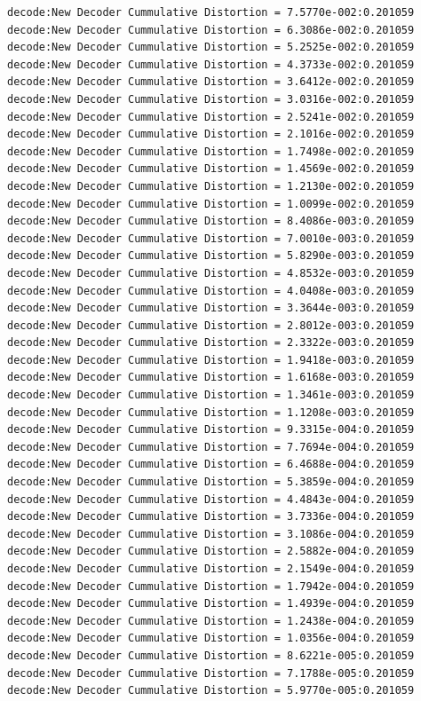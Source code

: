 \begin{verbatim}
decode:New Decoder Cummulative Distortion = 7.5770e-002:0.201059
decode:New Decoder Cummulative Distortion = 6.3086e-002:0.201059
decode:New Decoder Cummulative Distortion = 5.2525e-002:0.201059
decode:New Decoder Cummulative Distortion = 4.3733e-002:0.201059
decode:New Decoder Cummulative Distortion = 3.6412e-002:0.201059
decode:New Decoder Cummulative Distortion = 3.0316e-002:0.201059
decode:New Decoder Cummulative Distortion = 2.5241e-002:0.201059
decode:New Decoder Cummulative Distortion = 2.1016e-002:0.201059
decode:New Decoder Cummulative Distortion = 1.7498e-002:0.201059
decode:New Decoder Cummulative Distortion = 1.4569e-002:0.201059
decode:New Decoder Cummulative Distortion = 1.2130e-002:0.201059
decode:New Decoder Cummulative Distortion = 1.0099e-002:0.201059
decode:New Decoder Cummulative Distortion = 8.4086e-003:0.201059
decode:New Decoder Cummulative Distortion = 7.0010e-003:0.201059
decode:New Decoder Cummulative Distortion = 5.8290e-003:0.201059
decode:New Decoder Cummulative Distortion = 4.8532e-003:0.201059
decode:New Decoder Cummulative Distortion = 4.0408e-003:0.201059
decode:New Decoder Cummulative Distortion = 3.3644e-003:0.201059
decode:New Decoder Cummulative Distortion = 2.8012e-003:0.201059
decode:New Decoder Cummulative Distortion = 2.3322e-003:0.201059
decode:New Decoder Cummulative Distortion = 1.9418e-003:0.201059
decode:New Decoder Cummulative Distortion = 1.6168e-003:0.201059
decode:New Decoder Cummulative Distortion = 1.3461e-003:0.201059
decode:New Decoder Cummulative Distortion = 1.1208e-003:0.201059
decode:New Decoder Cummulative Distortion = 9.3315e-004:0.201059
decode:New Decoder Cummulative Distortion = 7.7694e-004:0.201059
decode:New Decoder Cummulative Distortion = 6.4688e-004:0.201059
decode:New Decoder Cummulative Distortion = 5.3859e-004:0.201059
decode:New Decoder Cummulative Distortion = 4.4843e-004:0.201059
decode:New Decoder Cummulative Distortion = 3.7336e-004:0.201059
decode:New Decoder Cummulative Distortion = 3.1086e-004:0.201059
decode:New Decoder Cummulative Distortion = 2.5882e-004:0.201059
decode:New Decoder Cummulative Distortion = 2.1549e-004:0.201059
decode:New Decoder Cummulative Distortion = 1.7942e-004:0.201059
decode:New Decoder Cummulative Distortion = 1.4939e-004:0.201059
decode:New Decoder Cummulative Distortion = 1.2438e-004:0.201059
decode:New Decoder Cummulative Distortion = 1.0356e-004:0.201059
decode:New Decoder Cummulative Distortion = 8.6221e-005:0.201059
decode:New Decoder Cummulative Distortion = 7.1788e-005:0.201059
decode:New Decoder Cummulative Distortion = 5.9770e-005:0.201059

\end{verbatim}
